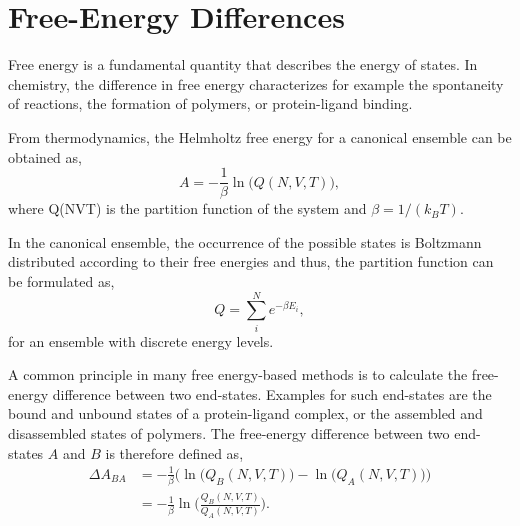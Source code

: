 \section{Free-Energy Differences}
Free energy is a fundamental quantity that describes the energy of states. In chemistry, the difference in free energy characterizes for example the spontaneity of reactions, the formation of polymers, or protein-ligand binding.\cite{Kollman1993, Armacost2020, Christ2009, Hansen2014, Cournia2020} 

From thermodynamics, the Helmholtz free energy\cite{Helmholtz1882} for a canonical ensemble can be obtained as, 
\begin{equation}
    A =  -\frac{1}{\beta} \ln\Big(Q(N, V, T)\Big),
\end{equation}
where Q(NVT) is the partition function of the system and $\beta = 1/(k_B T)$. \cite{Atkins2014}

In the canonical ensemble, the occurrence of the possible states is Boltzmann distributed \cite{Boltzmann1872} according to their free energies and thus, the partition function can be formulated as,
\begin{equation}
    Q =\sum^N_i e^{-\beta E_i} ,
\end{equation} 
for an ensemble with discrete energy levels.  \cite{Atkins2014}

A common principle in many free energy-based methods is to calculate the free-energy difference between two end-states. \cite{Ytreberg2006, Kirkwood1935, Zwanzig1954} Examples for such end-states are the bound and unbound states of a protein-ligand complex, or the assembled and disassembled states of polymers. \cite{Kollman1993, Armacost2020, Christ2009, Hansen2014, Cournia2020} 
%
The free-energy difference between two end-states $A$ and $B$ is therefore defined as,  \cite{Atkins2014}
\begin{equation}
    \begin{split}
        \Delta A_{BA} &= -\frac{1}{\beta} \bigg(\ln\big( Q_B(N, V, T) ) - \ln(Q_A(N, V, T)\big)\bigg)\\
        &= -\frac{1}{\beta} \ln\Bigg(\frac{Q_B(N, V, T)}{Q_A(N, V, T)}\Bigg).
    \end{split}
\end{equation}

